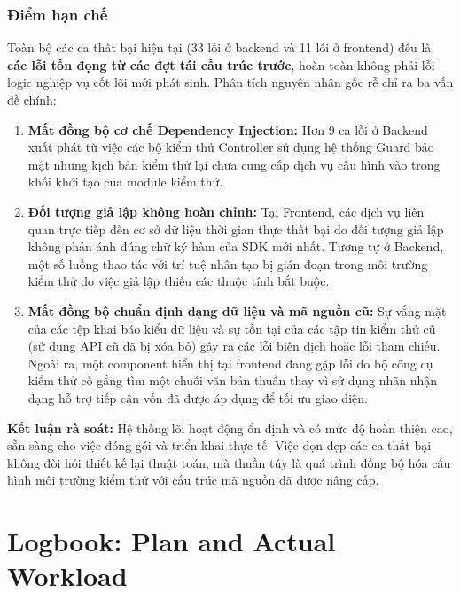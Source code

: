 \documentclass[12pt, a4paper]{article}
\begin{document}
\subsubsection{Điểm hạn chế}
Toàn bộ các ca thất bại hiện tại (33 lỗi ở backend và 11 lỗi ở frontend) đều là \textbf{các lỗi tồn đọng từ các đợt tái cấu trúc trước}, hoàn toàn không phải lỗi logic nghiệp vụ cốt lõi mới phát sinh. Phân tích nguyên nhân gốc rễ chỉ ra ba vấn đề chính:

\begin{enumerate}
    \item \textbf{Mất đồng bộ cơ chế Dependency Injection:} Hơn 9 ca lỗi ở Backend xuất phát từ việc các bộ kiểm thử Controller sử dụng hệ thống Guard bảo mật nhưng kịch bản kiểm thử lại chưa cung cấp dịch vụ cấu hình vào trong khối khởi tạo của module kiểm thử.
    \item \textbf{Đối tượng giả lập không hoàn chỉnh:} Tại Frontend, các dịch vụ liên quan trực tiếp đến cơ sở dữ liệu thời gian thực thất bại do đối tượng giả lập không phản ánh đúng chữ ký hàm của SDK mới nhất. Tương tự ở Backend, một số luồng thao tác với trí tuệ nhân tạo bị gián đoạn trong môi trường kiểm thử do việc giả lập thiếu các thuộc tính bắt buộc.
    \item \textbf{Mất đồng bộ chuẩn định dạng dữ liệu và mã nguồn cũ:} Sự vắng mặt của các tệp khai báo kiểu dữ liệu và sự tồn tại của các tập tin kiểm thử cũ (sử dụng API cũ đã bị xóa bỏ) gây ra các lỗi biên dịch hoặc lỗi tham chiếu. Ngoài ra, một component hiển thị tại frontend đang gặp lỗi do bộ công cụ kiểm thử cố gắng tìm một chuỗi văn bản thuần thay vì sử dụng nhãn nhận dạng hỗ trợ tiếp cận vốn đã được áp dụng để tối ưu giao diện.
\end{enumerate}

\textbf{Kết luận rà soát:} 
Hệ thống lõi hoạt động ổn định và có mức độ hoàn thiện cao, sẵn sàng cho việc đóng gói và triển khai thực tế. Việc dọn dẹp các ca thất bại không đòi hỏi thiết kế lại thuật toán, mà thuần túy là quá trình đồng bộ hóa cấu hình môi trường kiểm thử với cấu trúc mã nguồn đã được nâng cấp.

\section{Logbook: Plan and Actual Workload}
\end{document}
